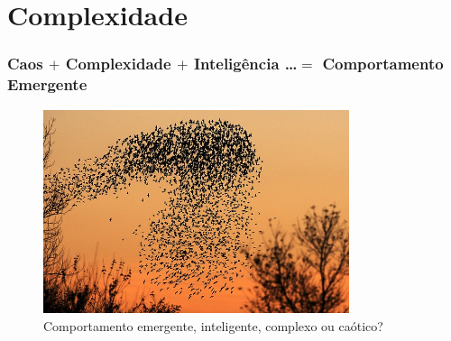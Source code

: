 \documentclass{beamer}
\begin{document}

\section{Complexidade}
\begin{frame}

\frametitle{Caos $ + $ Complexidade $ + $ Inteligência \ldots $=$ Comportamento Emergente}

\begin{figure}[ht!]
 \centering
 \includegraphics[width=0.8\textwidth , height=0.67\textheight]{figures/passaros_australia.jpg}

\caption{Comportamento emergente, inteligente, complexo ou caótico?} 

\end{figure}


\end{frame}
\end{document}
